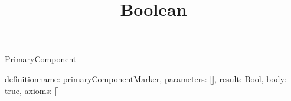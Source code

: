 \begin{lexlean}{PrimaryComponent}
\title{Boolean}
\begin{semanticmodule}
definition{name: primaryComponentMarker, parameters: [], result: Bool, body: true, axioms: []}
\end{semanticmodule}
\end{lexlean}
